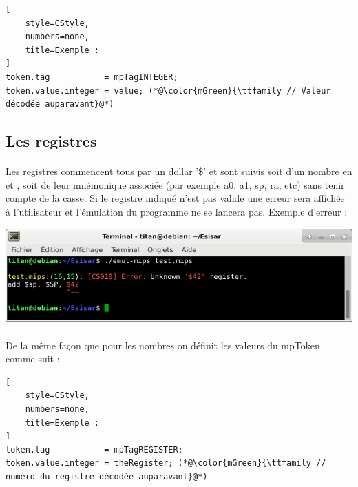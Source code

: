 \documentclass[12pt]{report} %
\begin{document}
\begin{lstlisting}[
    style=CStyle,
    numbers=none,
    title=Exemple :
]
token.tag           = mpTagINTEGER;
token.value.integer = value; (*@\color{mGreen}{\ttfamily // Valeur décodée auparavant}@*)
\end{lstlisting}


    \subsection{Les registres}
    \paragraph{}
    Les registres commencent tous par un dollar '{\ttfamily \$}' et sont suivis soit d'un nombre en {} et {}, soit de leur mnémonique associée (par exemple {\ttfamily a0}, {\ttfamily a1}, {\ttfamily sp}, {\ttfamily ra}, etc) sans tenir compte de la casse. Si le registre indiqué n'est pas valide une erreur sera affichée à l'utilisateur et l'émulation du programme ne se lancera pas. Exemple d'erreur :

    \begin{center}
        \includegraphics[width=\textwidth]{MIPS-mpToken-registre.png}
    \end{center}

    \paragraph{}
    De la même façon que pour les nombres on définit les valeurs du {\ttfamily mpToken} comme suit :

\begin{lstlisting}[
    style=CStyle,
    numbers=none,
    title=Exemple :
]
token.tag           = mpTagREGISTER;
token.value.integer = theRegister; (*@\color{mGreen}{\ttfamily // numéro du registre décodée auparavant}@*)
\end{lstlisting}
\end{document}
